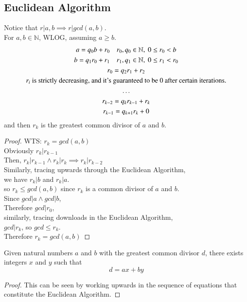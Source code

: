 \documentclass[11pt]{article}
\begin{document}
		\subsection{Euclidean Algorithm}
		\par Notice that $r | a, b \implies r | gcd(a, b)$. \\
		For $a, b \in \mathbb{N}$, WLOG, assuming $a \geq b$.
		\begin{gather*}
			a = q_0 b + r_0\quad r_0, q_0 \in \mathbb{N},\ 0 \leq r_0 < b \\
			b = q_1 r_0 + r_1\quad r_1, q_1 \in \mathbb{N},\ 0 \leq r_1 < r_0 \\
			r_0 = q_2 r_1 + r_2 \\
			r_i \text{{ is strictly decreasing, and it's guaranteed to be 0 after certain iterations.}} \\
			\dots \\
			r_{k-2} = q_{k} r_{k-1} + r_k \\ 
			r_{k-1} = q_{k+1} r_k + 0
		\end{gather*}
		and then $r_k$ is the greatest common divisor of $a$ and $b$.
		\begin{proof}
			WTS: $r_k = gcd(a, b)$ \\
			Obviously $r_k | r_{k-1}$ \\
			Then, $r_k | r_{k-1} \land r_k | r_k \implies r_k | r_{k-2}$ \\
			Similarly, tracing upwards through the Euclidean Algorithm, \\
			we have $r_k | b$ and $r_k | a$. \\
			so $r_k \leq gcd(a, b)$ since $r_k$ is a common divisor of $a$ and $b$. \\
			Since $gcd | a \land gcd | b$, \\
			Therefore $gcd | r_0$, \\
			similarly, tracing downloads in the Euclidean Algorithm, \\
			$gcd | r_k$, so $gcd \leq r_k$. \\
			Therefore $r_k = gcd(a, b)$
		\end{proof}
	
	\begin{theorem}
		Given natural numbers $a$ and $b$ with the greatest common divisor $d$, there exists integers $x$ and $y$ such that 
		\[
			d = ax + by
		\]
	\end{theorem}
	\begin{proof}
		This can be seen by working upwards in the sequence of equations that constitute the Euclidean Algorithm. 
	\end{proof}
		
\end{document}
